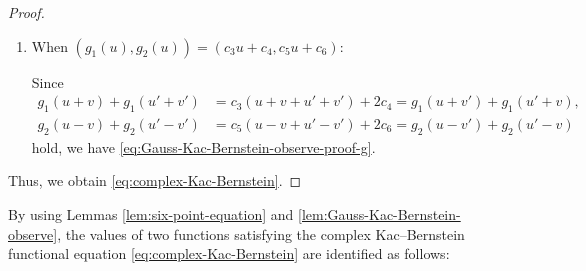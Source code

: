 \documentclass[12pt]{article}
\theoremstyle{definition}
\theoremstyle{remark}
\numberwithin{equation}{section}
\numberwithin{figure}{section}
\numberwithin{table}{section}
\begin{document}
\begin{proof}
\begin{enumerate}[label=(Case \arabic*)]
\item
When $ ( g_1 ( u ) , g_2 ( u ) ) = ( c_3 u + c_4 , c_5 u + c_6 ) $:

Since
\begin{align}
g_1 ( u + v ) + g_1 ( u' + v' )
& = c_3 ( u + v + u' + v' ) + 2 c_4
= g_1 ( u + v' )  + g_1 ( u' + v ), \\
g_2 ( u - v ) + g_2 ( u' - v' )
& = c_5 ( u - v + u' - v' ) + 2 c_6
= g_2 ( u - v' )  + g_2 ( u' - v )
\end{align}
hold, we have \eqref{eq:Gauss-Kac-Bernstein-observe-proof-g}.

\end{enumerate}

Thus, we obtain \eqref{eq:complex-Kac-Bernstein}.
\end{proof}

By using Lemmas \ref{lem:six-point-equation} and \ref{lem:Gauss-Kac-Bernstein-observe}, the values of two functions satisfying the complex Kac--Bernstein functional equation \eqref{eq:complex-Kac-Bernstein} are identified as follows:
\end{document}
